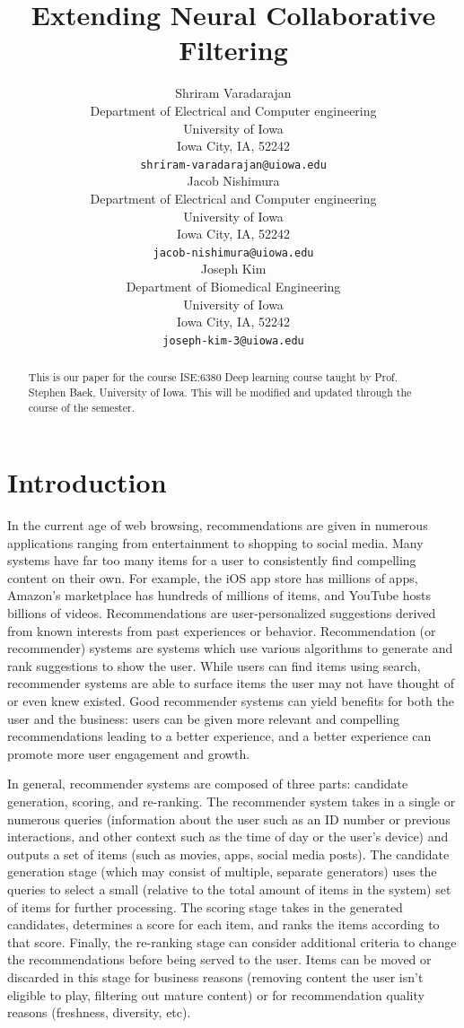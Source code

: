 \documentclass{article}
\title{Extending Neural Collaborative Filtering}
\author{
Shriram Varadarajan \\
Department of Electrical and Computer engineering\\
University of Iowa\\
Iowa City, IA, 52242 \\
\texttt{shriram-varadarajan@uiowa.edu} \\
\And
Jacob Nishimura \\
Department of Electrical and Computer engineering\\
University of Iowa\\
Iowa City, IA, 52242 \\
\texttt{jacob-nishimura@uiowa.edu} \\
\And
Joseph Kim \\
Department of Biomedical Engineering\\
University of Iowa\\
Iowa City, IA, 52242 \\
\texttt{joseph-kim-3@uiowa.edu} \\
}
\begin{document}
\maketitle

\begin{abstract}
This is our paper for the course ISE:6380 Deep learning course taught by Prof. Stephen Baek, University of Iowa. This will be modified and updated through the course of the semester.
\end{abstract}




\section{Introduction}
In the current age of web browsing, recommendations are given in numerous applications ranging from entertainment to shopping to social media. Many systems have far too many items for a user to consistently find compelling content on their own. For example, the iOS app store has millions of apps, Amazon's marketplace has hundreds of millions of items, and YouTube hosts billions of videos. Recommendations are user-personalized suggestions derived from known interests from past experiences or behavior. Recommendation (or recommender) systems are systems which use various algorithms to generate and rank suggestions to show the user. While users can find items using search, recommender systems are able to surface items the user may not have thought of or even knew existed. Good recommender systems can yield benefits for both the user and the business: users can be given more relevant and compelling recommendations leading to a better experience, and a better experience can promote more user engagement and growth.

In general, recommender systems are composed of three parts: candidate generation, scoring, and re-ranking. The recommender system takes in a single or numerous queries (information about the user such as an ID number or previous interactions, and other context such as the time of day or the user's device) and outputs a set of items (such as movies, apps, social media posts). The candidate generation stage (which may consist of multiple, separate generators) uses the queries to select a small (relative to the total amount of items in the system) set of items for further processing. The scoring stage takes in the generated candidates, determines a score for each item, and ranks the items according to that score. Finally, the re-ranking stage can consider additional criteria to change the recommendations before being served to the user. Items can be moved or discarded in this stage for business reasons (removing content the user isn't eligible to play, filtering out mature content) or for recommendation quality reasons (freshness, diversity, etc).
\end{document}
